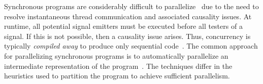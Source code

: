 Synchronous programs are considerably difficult to 
parallelize~\cite{distributed_reactive_systems_survey,wcrt_esterel_multicores,YuanYR11} 
due to the need to resolve instantaneous thread communication and
associated causality issues. 
At runtime, all potential signal emitters
must be executed before all testers of a signal. 
If this is not possible, then a causality issue arises. 
Thus, concurrency is typically \emph{compiled away} to
produce only sequential code~\cite{timed_cec}. The common approach for
parallelizing synchronous programs is to automatically
parallelize an intermediate representation of the
program~\cite{distributed_reactive_systems_survey,wcrt_esterel_multicores,YuanYR11,multiprocessing_openmp_synchronous}. 
The techniques differ
in the heuristics used to partition the program to achieve
sufficient parallelism. 

